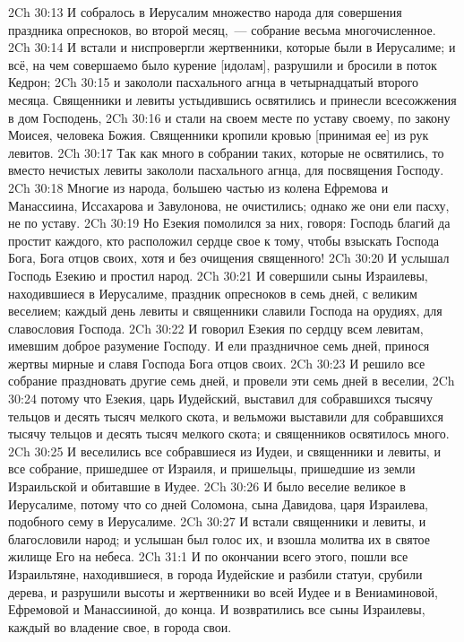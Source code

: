 \rsbpar\vs 2Ch 30:13 И собралось в Иерусалим множество народа для совершения праздника опресноков, во второй месяц,~--- собрание весьма многочисленное.
\vs 2Ch 30:14 И встали и ниспровергли жертвенники, которые были в Иерусалиме; и всё, на чем совершаемо было курение [идолам], разрушили и бросили в поток Кедрон;
\vs 2Ch 30:15 и закололи пасхального агнца в четырнадцатый  второго месяца. Священники и левиты устыдившись освятились и принесли всесожжения в дом Господень,
\vs 2Ch 30:16 и стали на своем месте по уставу своему, по закону Моисея, человека Божия. Священники кропили кровью [принимая ее] из рук левитов.
\vs 2Ch 30:17 Так как много  в собрании таких, которые не освятились, то вместо нечистых левиты закололи пасхального агнца, для посвящения Господу.
\vs 2Ch 30:18 Многие из народа, большею частью из колена Ефремова и Манассиина, Иссахарова и Завулонова, не очистились; однако же они ели пасху, не по уставу.
\vs 2Ch 30:19 Но Езекия помолился за них, говоря: Господь благий да простит каждого, кто расположил сердце свое к тому, чтобы взыскать Господа Бога, Бога отцов своих, хотя и без очищения священного!
\vs 2Ch 30:20 И услышал Господь Езекию и простил народ.
\rsbpar\vs 2Ch 30:21 И совершили сыны Израилевы, находившиеся в Иерусалиме, праздник опресноков в семь дней, с великим веселием; каждый день левиты и священники славили Господа на орудиях,  для славословия Господа.
\vs 2Ch 30:22 И говорил Езекия по сердцу всем левитам, имевшим доброе разумение  Господу. И ели праздничное семь дней, принося жертвы мирные и славя Господа Бога отцов своих.
\vs 2Ch 30:23 И решило все собрание праздновать другие семь дней, и провели эти семь дней в веселии,
\vs 2Ch 30:24 потому что Езекия, царь Иудейский, выставил для собравшихся тысячу тельцов и десять тысяч мелкого скота, и вельможи выставили для собравшихся тысячу тельцов и десять тысяч мелкого скота; и священников освятилось  много.
\vs 2Ch 30:25 И веселились все собравшиеся из Иудеи, и священники и левиты, и все собрание, пришедшее от Израиля, и пришельцы, пришедшие из земли Израильской и обитавшие в Иудее.
\vs 2Ch 30:26 И было веселие великое в Иерусалиме, потому что со дней Соломона, сына Давидова, царя Израилева,  подобного сему в Иерусалиме.
\vs 2Ch 30:27 И встали священники и левиты, и благословили народ; и услышан был голос их, и взошла молитва их в святое жилище Его на небеса.
\vs 2Ch 31:1 И по окончании всего этого, пошли все Израильтяне,  находившиеся, в города Иудейские и разбили статуи, срубили  дерева, и разрушили высоты и жертвенники во всей Иудее и в  Вениаминовой, Ефремовой и Манассииной, до конца. И  возвратились все сыны Израилевы, каждый во владение свое, в города свои.
